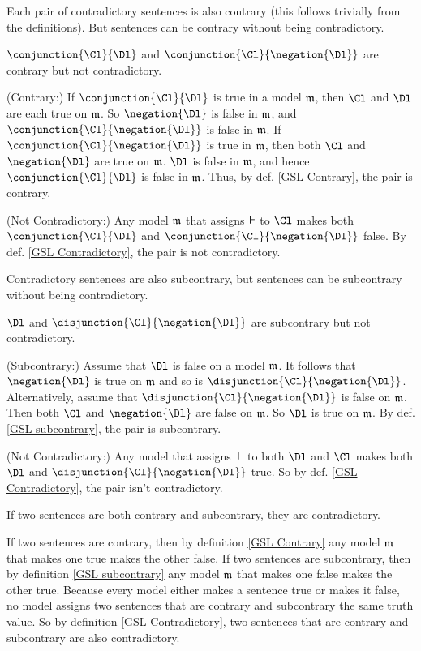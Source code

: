 \begin{majorILnc}{}
Each pair of contradictory sentences is also contrary (this follows trivially from the definitions). 
But sentences can be contrary without being contradictory.
\end{majorILnc}
\begin{PROOF}
$\conjunction{\Cl}{\Dl}$ and $\conjunction{\Cl}{\negation{\Dl}}$ are contrary but not contradictory.

(Contrary:) If $\conjunction{\Cl}{\Dl}$ is true in a model $\mathfrak{m}$, then $\Cl$ and $\Dl$ are each true on $\mathfrak{m}$. 
So $\negation{\Dl}$ is false in $\mathfrak{m}$, and $\conjunction{\Cl}{\negation{\Dl}}$ is false in $\mathfrak{m}$.
If $\conjunction{\Cl}{\negation{\Dl}}$ is true in $\mathfrak{m}$, then both $\Cl$ and $\negation{\Dl}$ are true on $\mathfrak{m}$.
$\Dl$ is false in $\mathfrak{m}$, and hence $\conjunction{\Cl}{\Dl}$ is false in $\mathfrak{m}$.
Thus, by def. \ref{GSL Contrary}, the pair is contrary.

(Not Contradictory:) Any model $\mathfrak{m}$ that assigns $\mathsf{F}$ to $\Cl$ makes both $\conjunction{\Cl}{\Dl}$ and $\conjunction{\Cl}{\negation{\Dl}}$ false.
By def. \ref{GSL Contradictory}, the pair is not contradictory.
\end{PROOF}
\begin{majorILnc}{}
Contradictory sentences are also subcontrary, but sentences can be subcontrary without being contradictory. 
\end{majorILnc}
\begin{PROOF}
$\Dl$ and $\disjunction{\Cl}{\negation{\Dl}}$ are subcontrary but not contradictory.

(Subcontrary:) Assume that $\Dl$ is false on a model $\mathfrak{m}$.
It follows that $\negation{\Dl}$ is true on $\mathfrak{m}$ and so is $\disjunction{\Cl}{\negation{\Dl}}$. 
Alternatively, assume that $\disjunction{\Cl}{\negation{\Dl}}$ is false on $\mathfrak{m}$.  Then both $\Cl$ and $\negation{\Dl}$ are false on $\mathfrak{m}$.
So $\Dl$ is true on $\mathfrak{m}$.
By def. \ref{GSL subcontrary}, the pair is subcontrary.

(Not Contradictory:) Any model that assigns $\mathsf{T}$ to both $\Dl$ and $\Cl$ makes both $\Dl$ and $\disjunction{\Cl}{\negation{\Dl}}$ true. 
So by def. \ref{GSL Contradictory}, the pair isn't contradictory.
\end{PROOF}
\begin{majorILnc}{}
If two sentences are both contrary and subcontrary, they are contradictory. 
\end{majorILnc}
\begin{PROOF}
If two sentences are contrary, then by definition \ref{GSL Contrary} any model $\mathfrak{m}$ that makes one true makes the other false. 
If two sentences are subcontrary, then by definition \ref{GSL subcontrary} any model $\mathfrak{m}$ that makes one false makes the other true. 
Because every model either makes a sentence true or makes it false, no model assigns two sentences that are contrary and subcontrary the same truth value. 
So by definition \ref{GSL Contradictory}, two sentences that are contrary and subcontrary are also contradictory. 
\end{PROOF}
